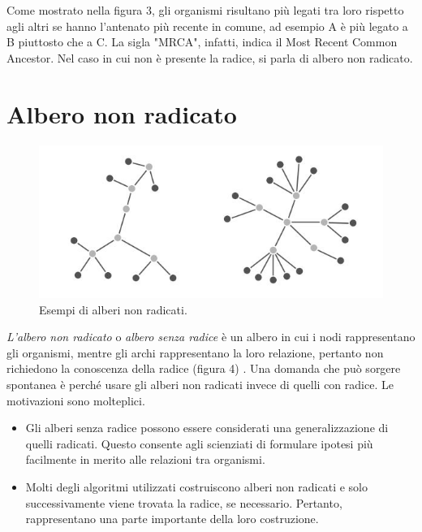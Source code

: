 \newline
Come mostrato nella figura 3, gli organismi risultano più legati tra loro rispetto agli altri se hanno l'antenato più recente in comune, ad esempio A è più legato a B piuttosto che a C. La sigla "MRCA", infatti, indica il Most Recent Common Ancestor.
\newline
Nel caso in cui non è presente la radice, si parla di albero non radicato.


\section{Albero non radicato}
\begin{figure}[h!]
	\includegraphics[width=\linewidth]{unrooted_trees.jpg}
 	\caption{Esempi di alberi non radicati.}
  	\label{fig:RootedTree}
\end{figure}
\textit{L'albero non radicato} o \textit{albero senza radice} è un albero in cui i nodi rappresentano gli organismi, mentre gli archi rappresentano la loro relazione, pertanto non richiedono la conoscenza della radice (figura 4) \cite{bioinfalganactivelearningapproachparttwo}.
\newline
Una domanda che può sorgere spontanea è perché usare gli alberi non radicati invece di quelli con radice. Le motivazioni sono molteplici.
\begin{itemize}
	\item Gli alberi senza radice possono essere considerati una generalizzazione di quelli radicati. Questo consente agli scienziati di formulare ipotesi più facilmente in merito alle relazioni tra organismi.
	\item Molti degli algoritmi utilizzati costruiscono alberi non radicati e solo successivamente viene trovata la radice, se necessario. Pertanto, rappresentano una parte importante della loro costruzione.
\end{itemize}


